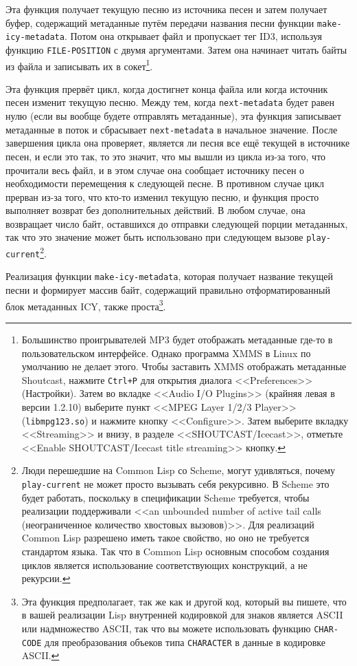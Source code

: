 Эта функция получает текущую песню из источника песен и затем получает буфер, содержащий
метаданные путём передачи названия песни функции \lstinline{make-icy-metadata}.  Потом она
открывает файл и пропускает тег ID3, используя функцию \lstinline{FILE-POSITION} с двумя
аргументами.  Затем она начинает читать байты из файла и записывать их в
сокет\footnote{Большинство проигрывателей MP3 будет отображать метаданные где-то в
  пользовательском интерфейсе.  Однако программа XMMS в Linux по умолчанию не делает
  этого. Чтобы заставить XMMS отображать метаданные Shoutcast, нажмите \lstinline{Ctrl+P} для
  открытия диалога <<Preferences>> (Настройки).  Затем во вкладке <<Audio I/O Plugins>>
  (крайняя левая в версии 1.2.10) выберите пункт <<MPEG Layer 1/2/3 Player>>
  (\lstinline{libmpg123.so}) и нажмите кнопку <<Configure>>.  Затем выберите вкладку
  <<Streaming>> и внизу, в разделе <<SHOUTCAST/Icecast>>, отметьте <<Enable
  SHOUTCAST/Icecast title streaming>> кнопку.}.

Эта функция прервёт цикл, когда достигнет конца файла или когда источник песен изменит
текущую песню.  Между тем, когда \lstinline{next-metadata} будет равен нулю (если вы вообще
будете отправлять метаданные), эта функция записывает метаданные в поток и сбрасывает
\lstinline{next-metadata} в начальное значение.  После завершения цикла она проверяет,
является ли песня все ещё текущей в источнике песен, и если это так, то это значит, что мы
вышли из цикла из-за того, что прочитали весь файл, и в этом случае она сообщает источнику
песен о необходимости перемещения к следующей песне.  В противном случае цикл прерван
из-за того, что кто-то изменил текущую песню, и функция просто выполняет возврат без
дополнительных действий.  В любом случае, она возвращает число байт, оставшихся до
отправки следующей порции метаданных, так что это значение может быть использовано при
следующем вызове \lstinline{play-current}\footnote{Люди перешедшие на Common Lisp со Scheme,
  могут удивляться, почему \lstinline{play-current} не может просто вызывать себя рекурсивно.  В
  Scheme это будет работать, поскольку в спецификации Scheme требуется, чтобы реализации
  поддерживали <<an unbounded number of active tail calls (неограниченное количество
  хвостовых вызовов)>>.  Для реализаций Common Lisp разрешено иметь такое свойство, но оно
  не требуется стандартом языка.  Так что в Common Lisp основным способом создания циклов
  является использование соответствующих конструкций, а не рекурсии.}.

Реализация функции \lstinline{make-icy-metadata}, которая получает название текущей песни
и формирует массив байт, содержащий правильно отформатированный блок метаданных ICY, также
проста\footnote{Эта функция предполагает, так же как и другой код, который вы пишете, что
  в вашей реализации Lisp внутренней кодировкой для знаков является ASCII или надмножество
  ASCII, так что вы можете использовать функцию \lstinline{CHAR-CODE} для преобразования
  объеков типа \lstinline{CHARACTER} в данные в кодировке ASCII.}.

